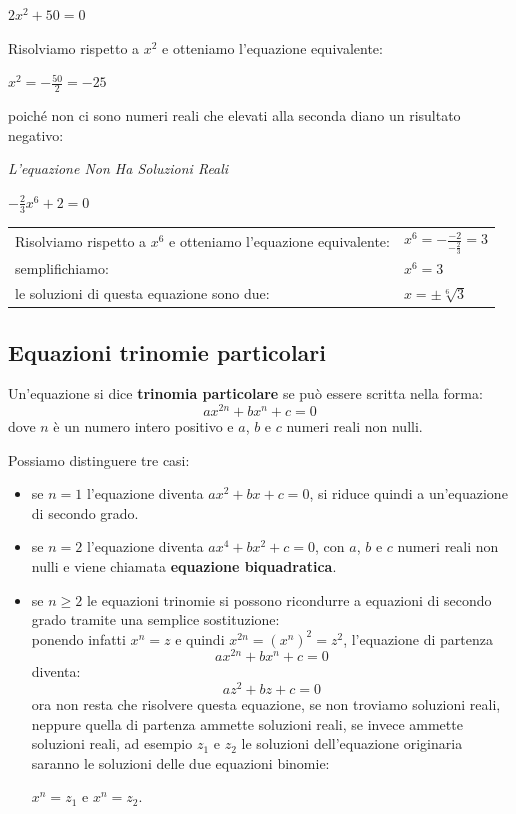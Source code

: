 \begin{esempio}
$2x^2 +50=0$

Risolviamo rispetto a $x^2$ e otteniamo l'equazione equivalente: 

$x^2=-\frac{50}{2}=-25$

poiché non ci sono numeri reali che elevati alla seconda diano un risultato 
negativo: 

\emph{L'equazione Non Ha Soluzioni Reali}
\end{esempio}    

\begin{esempio}
$-\frac{2}{3}x^6+2=0$
\begin{center}
\begin{tabular}{ll}
Risolviamo rispetto a $x^6$ e otteniamo l'equazione equivalente: & 
$x^6=-\frac{-2}{-\frac{2}{3}}=3$\\
semplifichiamo: & $x^6=3$\\
le soluzioni di questa equazione sono due: & $x=\pm \sqrt[6]{3}$
\end{tabular}
\end{center}
\end{esempio}

\subsection{Equazioni trinomie particolari}

\begin{definizione}
Un'equazione si dice \textbf{trinomia particolare} se può essere scritta nella 
forma:
$$ax^{2n}+bx^n+c=0$$
dove $n$ è un numero intero positivo e $a$, $b$ e $c$  numeri reali  non 
nulli. 
\end{definizione}

Possiamo distinguere tre casi:
\begin{itemize}
\item se $n=1$ l'equazione diventa $ax^{2}+bx+c=0$, si riduce 
quindi a un'equazione di secondo grado.
\item se $n=2$ l'equazione diventa $ax^{4}+bx^2+c=0$, con $a$, 
$b$ e $c$ numeri reali  non nulli e viene chiamata \textbf{equazione 
biquadratica}.
\item se $n\geq 2$ le equazioni trinomie si possono ricondurre a 
equazioni di secondo grado tramite una semplice sostituzione:\\
ponendo infatti $x^n=z$ e quindi $x^{2n}=(x^n)^2=z^2$, l'equazione 
di partenza
$$ax^{2n}+bx^n+c=0$$
diventa:
$$az^{2}+bz+c=0$$
ora non resta che risolvere questa equazione, se non troviamo 
soluzioni reali, neppure quella di partenza ammette soluzioni reali, se 
invece ammette soluzioni reali, ad esempio $z_1$ e $z_2$  le soluzioni 
dell'equazione originaria saranno le soluzioni delle due equazioni 
binomie:
\begin{center}
  $x^n=z_1$ e $x^n=z_2$.
\end{center}
\end{itemize}


